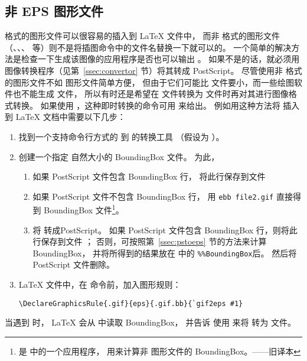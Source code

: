 \subsection{非 EPS 图形文件}\label{ssec:noneps}

 格式的图形文件可以很容易的插入到 \LaTeX{} 文件中，
而非  格式的图形文件（、、、 等）则不是将插图命令中的文件名替换一下就可以的。
一个简单的解决方法是检查一下生成该图像的应用程序是否也可以输出 。
如果不是的话，就必须用图像转换程序（见第~\ref{ssec:convertor} 节）将其转成 PostScript。
尽管使用非  格式的图形文件不如  图形文件简单方便，
但由于它们可能比  文件要小，而一些绘图软件也不能生成  文件，
所以有时还是希望在  文件转换为  文件时再对其进行图像格式转换。
如果使用 ，这种即时转换的命令可用 来给出。
例如用这种方法将  插入到 \LaTeX{} 文档中需要以下几步：
\begin{enumerate}
	\item 找到一个支持命令行方式的  到  的转换工具
	（假设为 ）。
	\item 创建一个指定  自然大小的 BoundingBox 文件。
	为此，
	\begin{enumerate}
		\item 如果 PostScript 文件包含 BoundingBox 行，
		将此行保存到文件 
		\item 如果 PostScript 文件不包含 BoundingBox 行，
		用 \verb|ebb file2.gif| 直接得到 BoundingBox 文件\footnote{
			 是  中的一个应用程序，
			用来计算非 图形文件的 BoundingBox。——旧译本}。
		\item 将  转成PostScript。
		如果 PostScript 文件包含 BoundingBox 行，则将此行保存到文件 ；
		否则，可按照第~\ref{ssec:pstoeps} 节的方法来计算 BoundingBox，
		并将所得到的结果放在  中的 \verb|%%BoundingBox|后。
		然后将 PostScript 文件删除。
	\end{enumerate}
	\item \LaTeX{} 文件中，在  命令前，加入图形规则：
\begin{lstlisting}
\DeclareGraphicsRule{.gif}{eps}{.gif.bb}{`gif2eps #1}
\end{lstlisting}
\end{enumerate}
当遇到  时，
\LaTeX{} 会从  中读取 BoundingBox，
并告诉  使用  来将  转为  文件。


